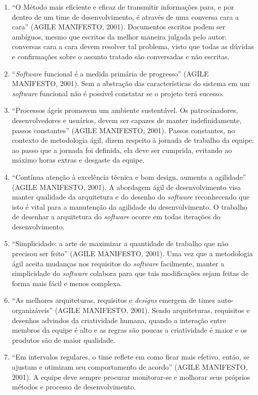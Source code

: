 \begin{enumerate}
	\item “O Método mais eficiente e eficaz de transmitir informações para, e por dentro de um time de desenvolvimento, é através de uma conversa cara a cara” (AGILE MANIFESTO, 2001). Documentos escritos podem ser ambíguos, mesmo que escritos da melhor maneira julgada pelo autor: conversas cara a cara devem resolver tal problema, visto que todas as dúvidas e confirmações sobre o assunto tratado são conversadas e não escritas.
	\item “\textit{Software} funcional é a medida primária de progresso” (AGILE MANIFESTO, 2001). Sem a abstração das características do sistema em um \textit{software} funcional não é possível constatar se o projeto terá sucesso.
	\item “Processos ágeis promovem um ambiente sustentável. Os patrocinadores, desenvolvedores e usuários, devem ser capazes de manter indefinidamente, passos constantes” (AGILE MANIFESTO, 2001). Passos constantes, no contexto de metodologia ágil, dizem respeito à jornada de trabalho da equipe: ao passo que a jornada foi definida, ela deve ser cumprida, evitando ao máximo horas extras e desgaste da equipe.
	\item “Contínua atenção à excelência técnica e bom design, aumenta a agilidade” (AGILE MANIFESTO, 2001). A abordagem ágil de desenvolvimento visa manter qualidade da arquitetura e do desenho do \textit{software} reconhecendo que isto é vital para a manutenção da agilidade do desenvolvimento. O trabalho de desenhar a arquitetura do \textit{software} ocorre em todas iterações do desenvolvimento.
	\item “Simplicidade: a arte de maximizar a quantidade de trabalho que não precisou ser feito” (AGILE MANIFESTO, 2001). Uma vez que a metodologia ágil aceita mudanças nos requisitos do \textit{software} facilmente, manter a simplicidade do \textit{software} colabora para que tais modificações sejam feitas de forma mais fácil e menos complexa.
	\item “As melhores arquiteturas, requisitos e \textit{designs} emergem de times auto-organizáveis” (AGILE MANIFESTO, 2001). Sendo arquiteturas, requisitos e desenhos advindos da criatividade humana, quando a interação entre membros da equipe é alto e as regras são poucas a criatividade é maior e os produtos são de maior qualidade.
	\item “Em intervalos regulares, o time reflete em como ficar mais efetivo, então, se ajustam e otimizam seu comportamento de acordo” (AGILE MANIFESTO, 2001). A equipe deve sempre procurar monitorar-se e molhorar seus próprios métodos e processo de desenvolvimento.

\end{enumerate}
